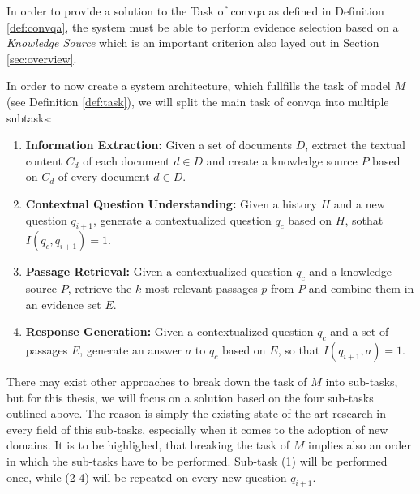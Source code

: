 In order to provide a solution to the Task of \gls{convqa} as defined in Definition \ref{def:convqa}, the system must be able to perform evidence selection based on a \textit{Knowledge Source} which is an important criterion also layed out in Section \ref{sec:overview}. 

In order to now create a system architecture, which fullfills the task of model $M$ (see Definition \ref{def:task}), we will split the main task of \gls{convqa} into multiple subtasks:

\begin{enumerate}
    \item \textbf{Information Extraction:} Given a set of documents $D$, extract the textual content $C_d$ of each document $d \in D$ and create a knowledge source $P$ based on $C_d$ of every document $d \in D$.
    \item \textbf{Contextual Question Understanding:} Given a history $H$ and a new question $q_{i+1}$, generate a contextualized question $q_c$ based on $H$, sothat $I(q_c,q_{i+1}) = 1$.
    \item \textbf{Passage Retrieval:} Given a contextualized question $q_c$ and a knowledge source $P$, retrieve the $k$-most relevant passages $p$ from $P$ and combine them in an evidence set $E$.
    \item \textbf{Response Generation:} Given a contextualized question $q_c$ and a set of passages $E$, generate an answer $a$ to $q_c$ based on $E$, so that $I(q_{i+1},a) = 1$.
\end{enumerate}

There may exist other approaches to break down the task of $M$ into sub-tasks, but for this thesis, we will focus on a solution based on the four sub-tasks outlined above. The reason is simply the existing state-of-the-art research in every field of this sub-tasks, especially when it comes to the adoption of new domains. It is to be highlighed, that breaking the task of $M$ implies also an order in which the sub-tasks have to be performed. Sub-task (1) will be performed once, while (2-4) will be repeated on every new question $q_{i+1}$.

